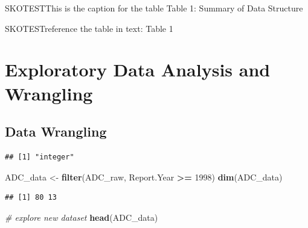 \documentclass[12pt,]{article}
\newenvironment{Shaded}{\begin{snugshade}}{\end{snugshade}}
\newcommand{\KeywordTok}[1]{\textcolor[rgb]{0.13,0.29,0.53}{\textbf{#1}}}
\newcommand{\DecValTok}[1]{\textcolor[rgb]{0.00,0.00,0.81}{#1}}
\newcommand{\StringTok}[1]{\textcolor[rgb]{0.31,0.60,0.02}{#1}}
\newcommand{\CommentTok}[1]{\textcolor[rgb]{0.56,0.35,0.01}{\textit{#1}}}
\newcommand{\OperatorTok}[1]{\textcolor[rgb]{0.81,0.36,0.00}{\textbf{#1}}}
\newcommand{\NormalTok}[1]{#1}
\begin{document}
SKOTESTThis is the caption for the table Table 1: Summary of Data
Structure

SKOTESTreference the table in text: Table 1

\newpage

\section{Exploratory Data Analysis and
Wrangling}\label{exploratory-data-analysis-and-wrangling}

\subsection{Data Wrangling}\label{data-wrangling}

\begin{Shaded}
\end{Shaded}

\begin{verbatim}
## [1] "integer"
\end{verbatim}

\begin{Shaded}
\begin{Highlighting}[]
\NormalTok{ADC_data <-}\StringTok{ }\KeywordTok{filter}\NormalTok{(ADC_raw, Report.Year }\OperatorTok{>=}\StringTok{ }\DecValTok{1998}\NormalTok{)}
\KeywordTok{dim}\NormalTok{(ADC_data)}
\end{Highlighting}
\end{Shaded}

\begin{verbatim}
## [1] 80 13
\end{verbatim}

\begin{Shaded}
\begin{Highlighting}[]
\CommentTok{# explore new dataset}
\KeywordTok{head}\NormalTok{(ADC_data)}
\end{Highlighting}
\end{Shaded}
\end{document}
